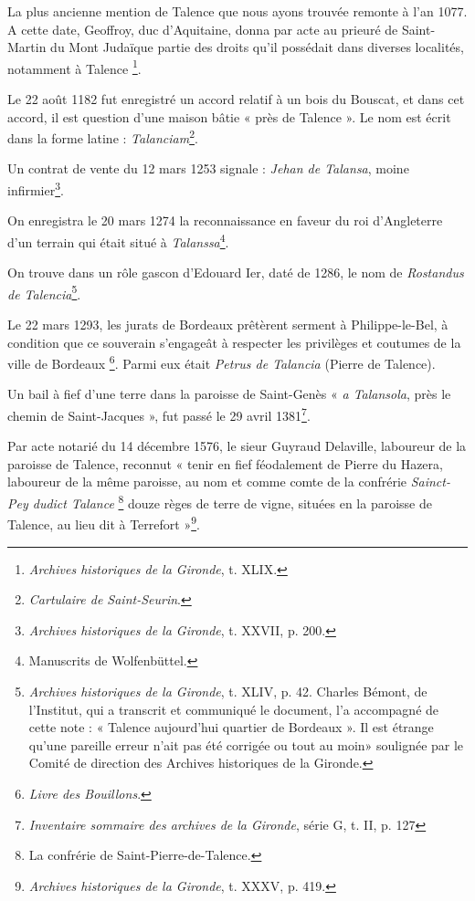La plus ancienne mention de Talence que nous ayons trouvée remonte à l'an 1077. A cette date, Geoffroy, duc d'Aquitaine, donna par acte au prieuré de Saint-Martin du Mont Judaïque partie des droits qu'il possédait dans diverses localités, notamment à Talence \footnote{\textit{Archives historiques de la Gironde}, t. XLIX.}.

Le 22 août 1182 fut enregistré un accord relatif à un bois du Bouscat, et dans cet accord, il est question d'une maison bâtie « près de Talence ». Le nom est écrit dans la forme latine : \textit{Talanciam}\footnote{\textit{Cartulaire de Saint-Seurin}.}.

Un contrat de vente du 12 mars 1253 signale : \textit{Jehan de Talansa}, moine infirmier\footnote{\textit{Archives historiques de la Gironde}, t. XXVII, p. 200.}.

On enregistra le 20 mars 1274 la reconnaissance en faveur du roi d'Angleterre d'un terrain qui était situé à \textit{Talanssa}\footnote{Manuscrits de Wolfenbüttel.}.

On trouve dans un rôle gascon d'Edouard Ier, daté de 1286, le nom de \textit{Rostandus de Talencia}\footnote{\textit{Archives historiques de la Gironde}, t. XLIV, p. 42. Charles Bémont, de l'Institut, qui a transcrit et communiqué le document, l'a accompagné de cette note : « Talence aujourd'hui quartier de Bordeaux ». Il est étrange qu'une pareille erreur n'ait pas été corrigée ou tout au moin» soulignée par le Comité de direction des Archives historiques de la Gironde.}.

Le 22 mars 1293, les jurats de Bordeaux prêtèrent serment à Philippe-le-Bel, à condition que ce souverain s'engageât à respecter les privilèges et coutumes de la ville de Bordeaux \footnote{\textit{Livre des Bouillons}.}. Parmi eux était \textit{Petrus de Talancia} (Pierre de Talence).

Un bail à fief d'une terre dans la paroisse de Saint-Genès « \textit{a Talansola}, près le chemin de Saint-Jacques », fut passé le 29 avril 1381\footnote{\textit{Inventaire sommaire des archives de la Gironde}, série G, t. II, p. 127}.

Par acte notarié du 14 décembre 1576, le sieur Guyraud Delaville, laboureur de la paroisse de Talence, reconnut « tenir en fief féodalement de Pierre du Hazera, laboureur de la même paroisse, au nom et comme comte de la confrérie \textit{Sainct-Pey dudict Talance} \footnote{La confrérie de Saint-Pierre-de-Talence.} douze règes de terre de vigne, situées en la paroisse de Talence, au lieu dit à Terrefort »\footnote{\textit{Archives historiques de la Gironde}, t. XXXV, p. 419.}.

